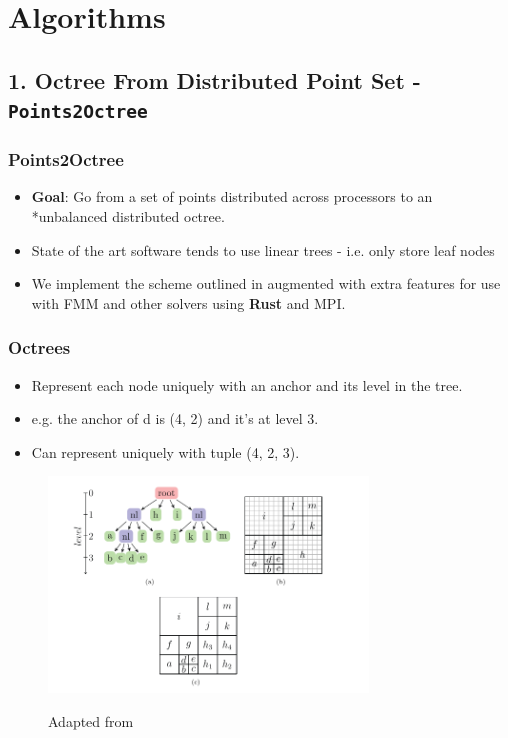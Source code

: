 \section{Algorithms}

\cprotect\subsection{1. Octree From Distributed Point Set - \verb|Points2Octree|}

\begin{frame}
\frametitle{Points2Octree}
\begin{itemize}
    \item \textbf{Goal}: Go from a set of points distributed across processors to an *unbalanced distributed octree.
    \item State of the art software tends to use linear trees - i.e. only store leaf nodes \cite{Malhotra2016,Isaac,Lashuk2009,Sundar2013,Sundar2007}
    \item We implement the scheme outlined in \cite{Sundar2007} augmented with extra features for use with FMM and other solvers using \textbf{Rust} and MPI.
\end{itemize}
\end{frame}

\begin{frame}
    \frametitle{Octrees}
    \begin{itemize}
        \item Represent each node uniquely with an anchor and its level in the tree.
        \item e.g. the anchor of d is (4, 2) and it's at level 3.
        \item Can represent uniquely with tuple (4, 2, 3).
    \end{itemize}

    \begin{figure}
        \centering
        \includegraphics[width=8.5cm]{assets/anchor.png}
        \label{fig:anchor}
        \caption{Adapted from \cite{Sundar2007}}
    \end{figure}
\end{frame}

